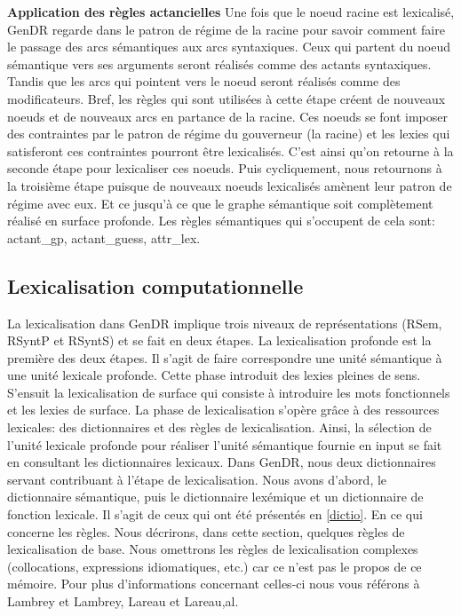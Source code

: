 \textbf{Application des règles actancielles}
Une fois que le noeud racine est lexicalisé, GenDR regarde dans le patron de régime de la racine pour savoir comment faire le passage des arcs sémantiques aux arcs syntaxiques. Ceux qui partent du noeud sémantique vers ses arguments seront réalisés comme des actants syntaxiques. Tandis que les arcs qui pointent vers le noeud seront réalisés comme des modificateurs. Bref, les règles qui sont utilisées à cette étape créent de nouveaux noeuds et de nouveaux arcs en partance de la racine. Ces noeuds se font imposer des contraintes par le patron de régime du gouverneur (la racine) et les lexies qui satisferont ces contraintes pourront être lexicalisés. C'est ainsi qu'on retourne à la seconde étape pour lexicaliser ces noeuds. Puis cycliquement, nous retournons à la troisième étape puisque de nouveaux noeuds lexicalisés amènent leur patron de régime avec eux. Et ce jusqu'à ce que le graphe sémantique soit complètement réalisé en surface profonde. Les règles sémantiques qui s'occupent de cela sont: actant\_gp, actant\_guess, attr\_lex. 

\subsection{Lexicalisation computationnelle}
La lexicalisation dans GenDR implique trois niveaux de représentations (RSem, RSyntP et RSyntS) et se fait en deux étapes. La lexicalisation profonde est la première des deux étapes. Il s'agit de faire correspondre une unité sémantique à une unité lexicale profonde. Cette phase introduit des lexies pleines de sens. S'ensuit la lexicalisation de surface qui consiste à introduire les mots fonctionnels et les lexies de surface. La phase de lexicalisation s'opère grâce à des ressources lexicales: des dictionnaires et des règles de lexicalisation. Ainsi, la sélection de l'unité lexicale profonde pour réaliser l'unité sémantique fournie en input se fait en consultant les dictionnaires lexicaux. Dans GenDR, nous deux dictionnaires servant contribuant à l'étape de lexicalisation. Nous avons d'abord, le dictionnaire sémantique, puis le dictionnaire lexémique et un dictionnaire de fonction lexicale. Il s'agit de ceux qui ont été présentés en \ref{dictio}. En ce qui concerne les règles. Nous décrirons, dans cette section, quelques règles de lexicalisation de base. Nous omettrons les règles de lexicalisation complexes (collocations, expressions idiomatiques, etc.) car ce n'est pas le propos de ce mémoire. Pour plus d'informations concernant celles-ci nous vous référons à Lambrey et Lambrey, Lareau et Lareau,al.

